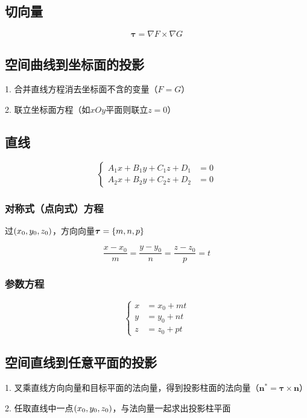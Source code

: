 \documentclass{article}
\begin{document}
\subsection{切向量}

\[\boldsymbol\tau=\nabla F\times\nabla G\]

\subsection{空间曲线到坐标面的投影}

1. 合并直线方程消去坐标面不含的变量（$F=G$）

2. 联立坐标面方程（如$xOy$平面则联立$z=0$）

\subsection{直线}

\[\left\{\begin{aligned}
        A_1x+B_1y+C_1z+D_1 & =0 \\
        A_2x+B_2y+C_2z+D_2 & =0
    \end{aligned}\right.\]

\subsubsection{对称式（点向式）方程}

过$\left(x_0,y_0,z_0\right)$，方向向量$\boldsymbol\tau=\left\{m,n,p\right\}$

\[\frac{x-x_0}m=\frac{y-y_0}n=\frac{z-z_0}p=t\]

\subsubsection{参数方程}

\[\left\{\begin{aligned}
        x & =x_0+mt \\
        y & =y_0+nt \\
        z & =z_0+pt
    \end{aligned}\right.\]

\subsection{空间直线到任意平面的投影}

1. 叉乘直线方向向量和目标平面的法向量，得到投影柱面的法向量（$\boldsymbol n^*=\boldsymbol\tau\times\boldsymbol n$）

2. 任取直线中一点$\left(x_0,y_0,z_0\right)$，与法向量一起求出投影柱平面
\end{document}
